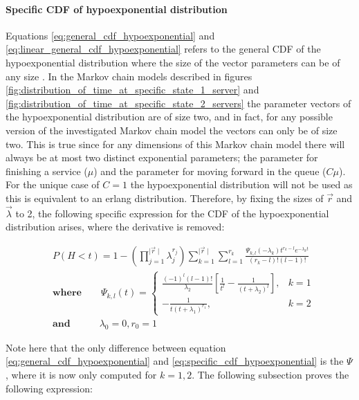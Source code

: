 \paragraph{Specific CDF of hypoexponential distribution}
Equations \ref{eq:general_cdf_hypoexponential} and
\ref{eq:linear_general_cdf_hypoexponential} refers to the general CDF of the
hypoexponential distribution where the size of the vector parameters can be of
any size \cite{Favaro2010}.
In the Markov chain models described in figures
\ref{fig:distribution_of_time_at_specific_state_1_server} and
\ref{fig:distribution_of_time_at_specific_state_2_servers} the parameter vectors
of the hypoexponential distribution are of size two, and in fact, for any
possible version of the investigated Markov chain model the vectors can only be
of size two.
This is true since for any dimensions of this Markov chain model there will
always be at most two distinct exponential parameters; the parameter for
finishing a service (\(\mu\)) and the parameter for moving forward in the queue
(\(C \mu\)).
For the unique case of \(C=1\) the hypoexponential distribution will not be
used as this is equivalent to an erlang distribution.
Therefore, by fixing the sizes of \(\vec{r}\) and \(\vec{\lambda}\) to 2, the
following specific expression for the CDF of the hypoexponential distribution
arises, where the derivative is removed:


\begin{align} \label{eq:specific_cdf_hypoexponential}
    & P(H < t) = 1 - \left( \prod_{j=1}^{\mid \vec{r} \mid} \lambda_j^{r_j}
    \right) \sum_{k=1}^{\mid \vec{r} \mid} \sum_{l=1}^{r_k}
    \frac{\Psi_{k,l}(-\lambda_k)t^{r_k - l} e^{-\lambda_k t}}{(r_k - l)!
    (l - 1)!} \nonumber \\
    & \textbf{where} \qquad \Psi_{k,l}(t) =
    \begin{cases}
        \frac{(-1)^{l} (l-1)!}{\lambda_2} \left[\frac{1}{t^l} - \frac{1}
        {(t + \lambda_2)^l}\right] , & k=1 \\
        - \frac{1}{t (t + \lambda_1)^{r_1}}, & k=2
    \end{cases} \nonumber \\
    & \textbf{and} \quad \qquad \lambda_0 = 0, r_0 = 1
\end{align}

Note here that the only difference between equation
\ref{eq:general_cdf_hypoexponential} and \ref{eq:specific_cdf_hypoexponential}
is the \(\Psi\), where it is now only computed for \(k=1,2\).
The following subsection proves the following expression:

